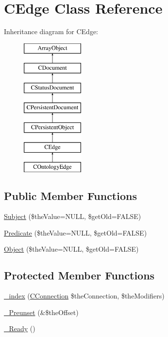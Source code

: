 \hypertarget{class_c_edge}{\section{C\-Edge Class Reference}
\label{class_c_edge}
}
Inheritance diagram for C\-Edge\-:\begin{figure}[H]
\begin{center}
\leavevmode
\includegraphics[height=7.000000cm]{class_c_edge}
\end{center}
\end{figure}
\subsection*{Public Member Functions}
\begin{DoxyCompactItemize}
\item 
\hyperlink{class_c_edge_a8031397d41fb274570fbbd68948c1841}{Subject} (\$the\-Value=N\-U\-L\-L, \$get\-Old=F\-A\-L\-S\-E)
\item 
\hyperlink{class_c_edge_ab86f5f67f0577c957ac9f2c0493f0e39}{Predicate} (\$the\-Value=N\-U\-L\-L, \$get\-Old=F\-A\-L\-S\-E)
\item 
\hyperlink{class_c_edge_a16960ecedab5d747b46f9d7ac9ddf9eb}{Object} (\$the\-Value=N\-U\-L\-L, \$get\-Old=F\-A\-L\-S\-E)
\end{DoxyCompactItemize}
\subsection*{Protected Member Functions}
\begin{DoxyCompactItemize}
\item 
\hyperlink{class_c_edge_a2b7580b50c8c50ff2382a229c6435211}{\-\_\-index} (\hyperlink{class_c_connection}{C\-Connection} \$the\-Connection, \$the\-Modifiers)
\item 
\hyperlink{class_c_edge_ac9dd0f883ce7867d0a5482eed84fe7f0}{\-\_\-\-Preunset} (\&\$the\-Offset)
\item 
\hyperlink{class_c_edge_a53e2c3f7c502c586554f70f5749d4c2d}{\-\_\-\-Ready} ()
\end{DoxyCompactItemize}
